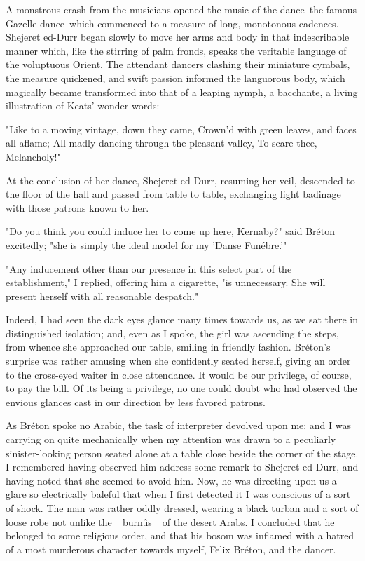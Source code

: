 A monstrous crash from the musicians opened the music of the
dance--the famous Gazelle dance--which commenced to a measure of
long, monotonous cadences. Shejeret ed-Durr began slowly to move her
arms and body in that indescribable manner which, like the stirring
of palm fronds, speaks the veritable language of the voluptuous Orient.
The attendant dancers clashing their miniature cymbals, the measure
quickened, and swift passion informed the languorous body, which
magically became transformed into that of a leaping nymph, a
bacchante, a living illustration of Keats' wonder-words:

    "Like to a moving vintage, down they came,
     Crown'd with green leaves, and faces all aflame;
     All madly dancing through the pleasant valley,
         To scare thee, Melancholy!"

At the conclusion of her dance, Shejeret ed-Durr, resuming her veil,
descended to the floor of the hall and passed from table to table,
exchanging light badinage with those patrons known to her.

"Do you think you could induce her to come up here, Kernaby?" said
Bréton excitedly; "she is simply the ideal model for my 'Danse
Funébre.'"

"Any inducement other than our presence in this select part of the
establishment," I replied, offering him a cigarette, "is unnecessary.
She will present herself with all reasonable despatch."

Indeed, I had seen the dark eyes glance many times towards us, as we
sat there in distinguished isolation; and, even as I spoke, the girl
was ascending the steps, from whence she approached our table, smiling
in friendly fashion. Bréton's surprise was rather amusing when she
confidently seated herself, giving an order to the cross-eyed waiter
in close attendance. It would be our privilege, of course, to pay the
bill. Of its being a privilege, no one could doubt who had observed
the envious glances cast in our direction by less favored patrons.

As Bréton spoke no Arabic, the task of interpreter devolved upon me;
and I was carrying on quite mechanically when my attention was drawn
to a peculiarly sinister-looking person seated alone at a table close
beside the corner of the stage. I remembered having observed him
address some remark to Shejeret ed-Durr, and having noted that she
seemed to avoid him. Now, he was directing upon us a glare so
electrically baleful that when I first detected it I was conscious of
a sort of shock. The man was rather oddly dressed, wearing a black
turban and a sort of loose robe not unlike the _burnûs_ of the desert
Arabs. I concluded that he belonged to some religious order, and that
his bosom was inflamed with a hatred of a most murderous character
towards myself, Felix Bréton, and the dancer.

